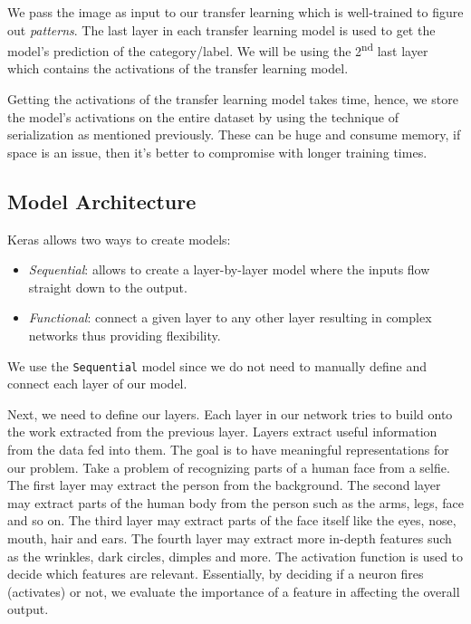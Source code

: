 \documentclass[twocolumn]{article}
\begin{document}
We pass the image as input to our transfer learning which is well-trained to 
figure out \textit{patterns}. The last layer in each transfer learning model 
is used to get the model’s prediction of the category/label. We will be using 
the 2\textsuperscript{nd} last layer which contains the activations of the 
transfer learning model.

Getting the activations of the transfer learning model takes time, hence, we 
store the model's activations on the entire dataset by using the technique of 
serialization as mentioned previously. These can be huge and consume memory, 
if space is an issue, then it’s better to compromise with longer training 
times.

\subsection{Model Architecture}

Keras allows two ways to create models:
\begin{itemize}
	\item \textit{Sequential}: allows to create a layer-by-layer model where the 
	inputs flow straight down to the output.
	\item \textit{Functional}: connect a given layer to any other layer 
	resulting in complex networks thus providing flexibility.
\end{itemize}

We use the \texttt{Sequential} model since we do not need to manually define 
and connect each layer of our model.

Next, we need to define our layers. Each layer in our network tries to build 
onto the work extracted from the previous layer. Layers extract useful 
information from the data fed into them. The goal is to have meaningful 
representations for our problem. Take a problem of recognizing parts of a 
human face from a selfie. The first layer may extract the person from the 
background. The second layer may extract parts of the human body from the 
person such as the arms, legs, face and so on. The third layer may extract 
parts of the face itself like the eyes, nose, mouth, hair and ears. The fourth 
layer may extract more in-depth features such as the wrinkles, dark circles, 
dimples and more. The activation function is used to decide which features are 
relevant. Essentially, by deciding if a neuron fires (activates) or not, we 
evaluate the importance of a feature in affecting the overall output.
\end{document}
